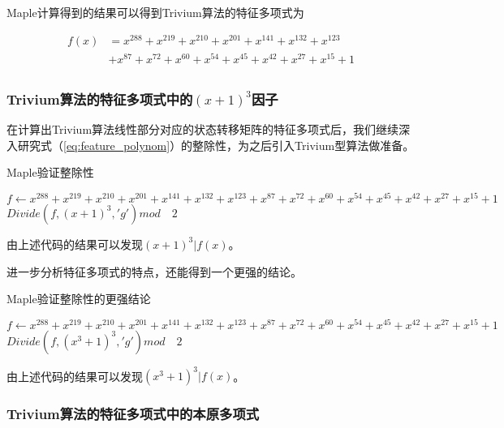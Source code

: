Maple计算得到的结果可以得到Trivium算法的特征多项式为

\[\begin{split}
f(x)&=x^{288}+x^{219}+x^{210}+x^{201}+x^{141}+x^{132}+x^{123}\\
&+x^{87}+x^{72}+x^{60}+x^{54}+x^{45}+x^{42}+x^{27}+x^{15}+1\\
\end{split}\]
\begin{equation}
\label{eq:feature_polynom}
\end{equation}

\subsubsection{Trivium算法的特征多项式中的$(x+1)^3$因子}

在计算出Trivium算法线性部分对应的状态转移矩阵的特征多项式后，我们继续深入研究式（\ref{eq:feature_polynom}）的整除性，为之后引入Trivium型算法做准备。

\begin{algorithm}[H]
  \caption{Maple验证整除性}
  \label{algo:maple_divide}
  \begin{algorithmic}
      
	   \STATE $f \leftarrow x^{288}+x^{219}+x^{210}+x^{201}+x^{141}+x^{132}+x^{123}+x^{87}+x^{72}+x^{60}+x^{54}+x^{45}+x^{42}+x^{27}+x^{15}+1$
       \STATE $Divide(f,(x+1)^{3},'g') mod \quad 2$

  \end{algorithmic}
\end{algorithm}

由上述代码的结果可以发现$(x+1)^3|f(x)$。


进一步分析特征多项式的特点，还能得到一个更强的结论。

\begin{algorithm}[H]
  \caption{Maple验证整除性的更强结论}
  \label{algo:maple_divide_2}
  \begin{algorithmic}
      
	   \STATE $f \leftarrow x^{288}+x^{219}+x^{210}+x^{201}+x^{141}+x^{132}+x^{123}+x^{87}+x^{72}+x^{60}+x^{54}+x^{45}+x^{42}+x^{27}+x^{15}+1$
       \STATE $Divide(f,(x^{3}+1)^{3},'g') mod \quad 2$

  \end{algorithmic}
\end{algorithm}

由上述代码的结果可以发现$(x^3+1)^3|f(x)$。

\subsubsection{Trivium算法的特征多项式中的本原多项式}

